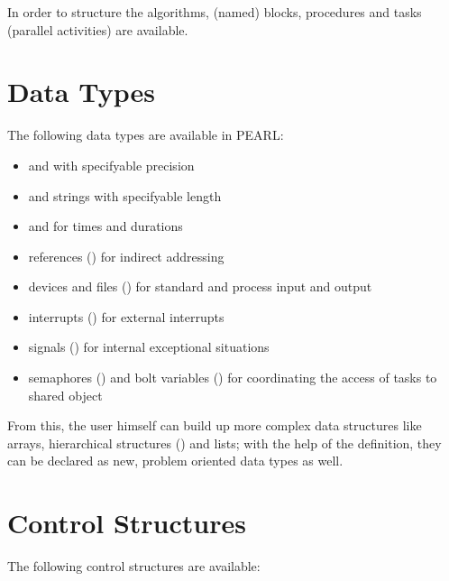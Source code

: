 In order to structure the algorithms, (named) blocks, procedures and
tasks (parallel activities) are available.

\section{Data Types}   %

The following data types are available in PEARL:

\begin{itemize}
\item {} and  with specifyable precision
\item {} and  strings with specifyable length
\item {} and  for times and durations
\item references () for indirect addressing
\item devices and files () for standard and process input and
      output
\item interrupts () for external interrupts
\item signals () for internal exceptional situations
\item semaphores () and bolt variables () for
      coordinating the access of tasks to shared object
\end{itemize}

From this, the user himself can build up more complex data structures
like arrays, hierarchical structures () and lists; with the help
of the  definition, they can be declared as new, problem oriented
data types as well.

\section{Control Structures}   %

The following control structures are available:

